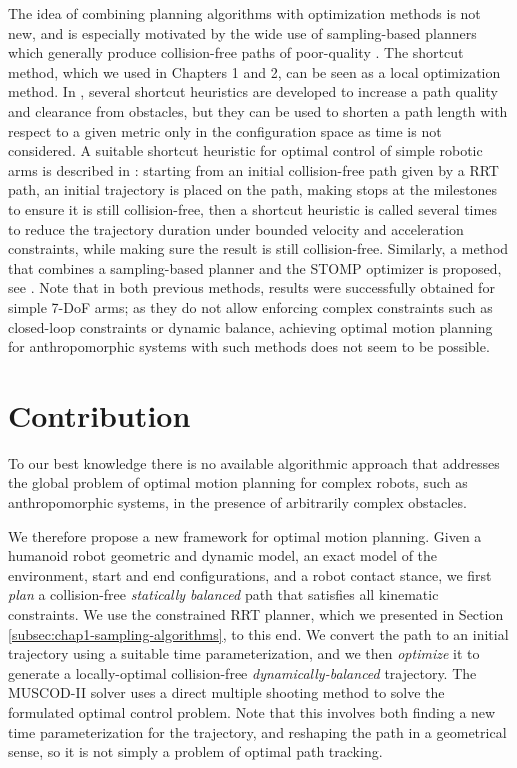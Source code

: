 The idea of combining planning algorithms with optimization methods is
not new, and is especially motivated by the wide use of sampling-based
planners which generally produce collision-free paths of poor-quality
\cite{lava06}. The shortcut method, which we used in Chapters 1 and 2,
can be seen as a local optimization method. In
\cite{geraerts2007creating}, several shortcut heuristics are developed
to increase a path quality and clearance from obstacles, but they can
be used to shorten a path length with respect to a given metric only
in the configuration space as time is not considered. A suitable
shortcut heuristic for optimal control of simple robotic arms is
described in \cite{hauser2010fast}: starting from an initial
collision-free path given by a RRT path, an initial trajectory is
placed on the path, making stops at the milestones to ensure it is
still collision-free, then a shortcut heuristic is called several
times to reduce the trajectory duration under bounded velocity and
acceleration constraints, while making sure the result is still
collision-free. Similarly, a method that combines a sampling-based
planner and the \textsc{STOMP} optimizer is proposed, see
\cite{mainprice2012planification}. Note that in both previous methods,
results were successfully obtained for simple 7-DoF arms; as they do
not allow enforcing complex constraints such as closed-loop
constraints or dynamic balance, achieving optimal motion planning for
anthropomorphic systems with such methods does not seem to be possible.

\section{Contribution}
\label{sec:chap3-contribution}

To our best knowledge there is no available algorithmic approach that
addresses the global problem of optimal motion planning for complex
robots, such as anthropomorphic systems, in the presence of
arbitrarily complex obstacles.

We therefore propose a new framework for optimal motion
planning. Given a humanoid robot geometric and dynamic model, an exact
model of the environment, start and end configurations, and a robot
contact stance, we first \emph{plan} a collision-free \emph{statically
  balanced} path that satisfies all kinematic constraints. We use the
constrained RRT planner, which we presented in Section
\ref{subsec:chap1-sampling-algorithms}, to this end. We convert the
path to an initial trajectory using a suitable time parameterization,
and we then \emph{optimize} it to generate a locally-optimal
collision-free \emph{dynamically-balanced} trajectory. The
\textsc{MUSCOD-II} solver uses a direct multiple shooting method to
solve the formulated optimal control problem. Note that this involves
both finding a new time parameterization for the trajectory, and
reshaping the path in a geometrical sense, so it is not simply a
problem of optimal path tracking.

